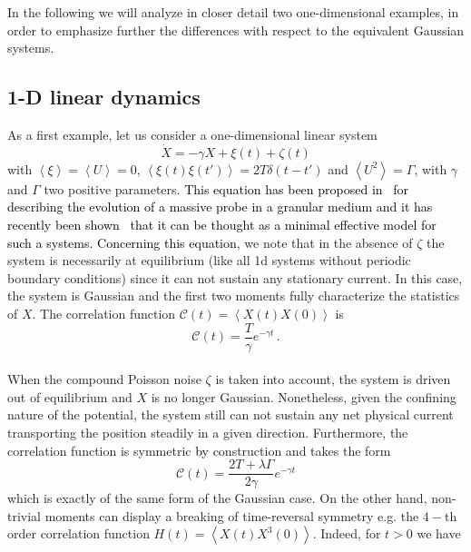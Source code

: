 \documentclass[12pt]{iopart}
\newcommand{\lx} {\left}
\newcommand{\rx} {\right}
\newcommand{\ave}[1] {\lx\langle #1 \rx\rangle}
\newcommand{\cC} {\mathcal{C}}
\begin{document}
In the following we will analyze in closer detail two one-dimensional examples, in order to  emphasize further the differences with respect to the equivalent Gaussian systems.%

\subsection{1-D linear dynamics}
As a first example, let us consider a one-dimensional linear system
\begin{equation}
    \dot{X}=-\gamma X + \xi(t)+\zeta(t)
\end{equation}
with $\ave{\xi}=\ave{U}=0$, $\ave{\xi(t)\xi(t')}=2T\delta(t-t')$ and $\ave{U^2}=\Gamma$, with $\gamma$ and $\Gamma$ two positive parameters. \textcolor{black}{This equation has been proposed in~\cite{kanazawa2012stochastic, kanazawa2015minimal, kanazawa2015asymptotic} for describing the evolution of a massive probe in a granular medium and it has recently been shown~\cite{lucente2023revealing} that it can be thought as a minimal effective model for such a systems. Concerning this equation,}
we note that in the absence of $\zeta$ the system is necessarily at equilibrium (like all 1d systems without periodic boundary conditions) since it can not sustain any stationary current. In this case, the system is Gaussian and the first two moments fully characterize the statistics of $X$. The correlation function $\cC(t)=\ave{X(t)X(0)}$ is 
\begin{equation}
\cC(t)=\frac{T}{\gamma} e^{-\gamma t}\,.
\end{equation}\\
When the compound Poisson noise $\zeta$ is taken into account, the system is driven out of equilibrium and $X$ is no longer Gaussian. Nonetheless, given the confining nature of the potential, the system still can not sustain any net physical current  transporting the position steadily in a given  direction. Furthermore, the correlation function is symmetric \textcolor{black}{by} construction and takes the form
\begin{equation}
\cC(t)=\frac{2T+\lambda\Gamma}{2\gamma} e^{-\gamma t}
\end{equation}
which is exactly of the same form of the Gaussian case. On the other hand, non-trivial moments can display a breaking of time-reversal symmetry e.g. the $4-$th order correlation function $H(t)=\ave{X(t)X^3(0)}$. Indeed, for $t>0$ we have 
\end{document}

